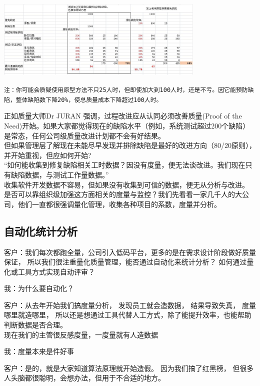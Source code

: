 
\includegraphics[width=10cm]{est缺陷表3.jpg}

\texttt{注：你可能会质疑使用原型方法不只25人时，但即使加大到100人时，还是不亏。因它能预防缺陷，整体缺陷数下降20\%，使总质量成本下降超过100人时。}

正如质量大师Dr JURAN 强调，过程改进应从认同必须改善质量(Proof of the
Need)开始。如果大家都觉得现在的缺陷水平（例如，系统测试超过200个缺陷）是常态，任何公司级质量改进计划都不会有好结果。\\
但如果管理层了解现在未能尽早发现并排除缺陷是最好的改进方向（80/20原则），并开始重视，但应如何开始?\\
``如何能收集到修复缺陷相关工时数据？因没有度量，便无法谈改进。我们现在只有缺陷数据，与测试工作量数据。''\\
收集软件开发数据不容易，但如果没有收集到可信的数据，便无从分析与改进。\\
是否可以靠组织级加强这方面相关的度量与监控？我们先看看一家几千人的大公司，他们一直都很强调量化管理，收集各种项目的系数，度量并分析。\\

\hypertarget{ux81eaux52a8ux5316ux7edfux8ba1ux5206ux6790}{%
\subsection{自动化统计分析}\label{ux81eaux52a8ux5316ux7edfux8ba1ux5206ux6790}}

客户：我们每次都跑全量，公司引入低码平台，更多的是在需求设计阶段做好质量保证，
所以我们很注重量化质量管理，能否通过自动化来统计分析？
如何通过量化或工具方式实现自动评审？

我：为什么要自动化？

客户：从去年开始我们搞度量分析， 发现员工就会造数据， 结果导致失真，
度量哪里就造哪里，
所以还是想通过工具代替人工方式，除了能提升效率，也能帮助判断数据是否合理。\\
现在我们的主管很反感度量，一度量就有人造数据

我：度量本来是件好事

客户：是的，就是大家知道算法原理就开始造假。 因为我们搞了红黑榜，
但很多人头脑都很聪明，会想办法，但用于不合适的地方。

